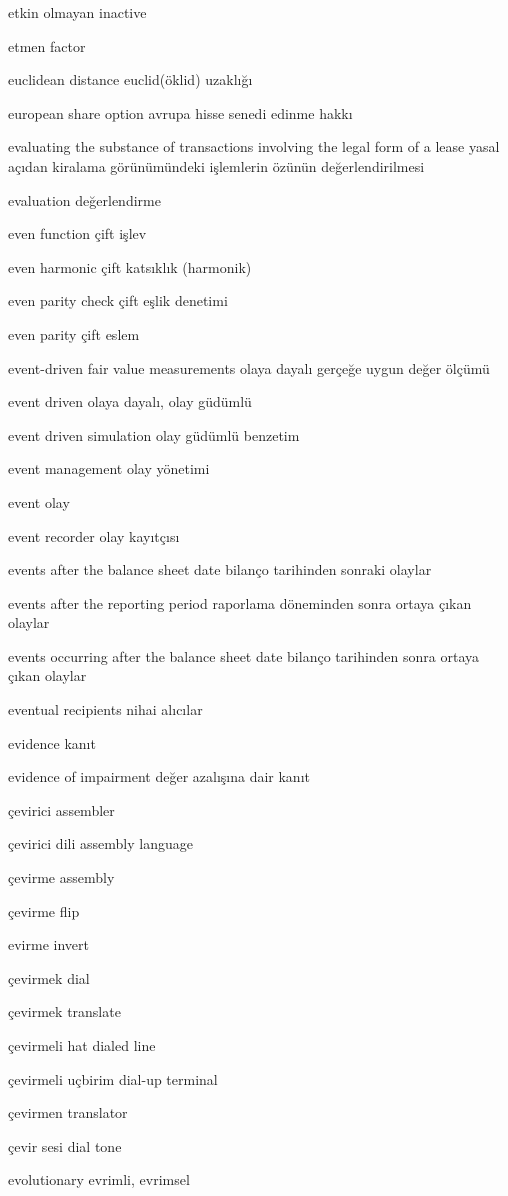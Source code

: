 \documentclass[12pt,fleqn]{article}\usepackage{../../common}
\begin{document}
etkin olmayan inactive

etmen factor

euclidean distance euclid(öklid) uzaklığı

european share option avrupa hisse senedi edinme hakkı

evaluating the substance of transactions involving the legal form of a lease yasal açıdan kiralama görünümündeki işlemlerin özünün değerlendirilmesi

evaluation değerlendirme

even function çift işlev

even harmonic çift katsıklık (harmonik)

even parity check çift eşlik denetimi

even parity çift eslem

event-driven fair value measurements olaya dayalı gerçeğe uygun değer ölçümü

event driven olaya dayalı, olay güdümlü

event driven simulation olay güdümlü benzetim

event management olay yönetimi

event olay

event recorder olay kayıtçısı

events after the balance sheet date bilanço tarihinden sonraki olaylar

events after the reporting period raporlama döneminden sonra ortaya çıkan olaylar

events occurring after the balance sheet date bilanço tarihinden sonra ortaya çıkan olaylar

eventual recipients nihai alıcılar

evidence kanıt

evidence of impairment değer azalışına dair kanıt

çevirici assembler

çevirici dili assembly language

çevirme assembly

çevirme flip

evirme invert

çevirmek dial

çevirmek translate

çevirmeli hat dialed line

çevirmeli uçbirim dial-up terminal

çevirmen translator

çevir sesi dial tone

evolutionary evrimli, evrimsel
\end{document}

